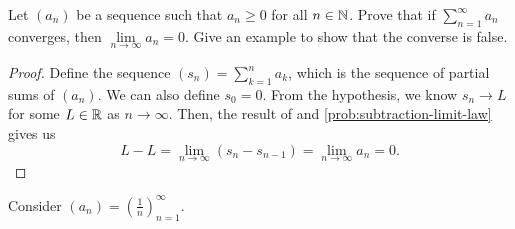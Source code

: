 \begin{problem}
  Let $(a_{n})$ be a sequence such that $a_{n} \geq 0$ for all $n \in \mathbb{N}$. 
  Prove that if $\sum\limits_{n=1}^{\infty} a_{n}$ converges, then
  $\lim\limits_{n \to \infty} a_{n} = 0$. Give an example to show that the 
  converse is false.

  \begin{proof} 
    Define the sequence $(s_{n}) = \sum\limits_{k=1}^{n} a_{k}$, which is the sequence of partial sums of $(a_{n})$.
    We can also define $s_{0} = 0$. From the hypothesis, we know $s_{n} \to L$ for some $L \in \mathbb{R}$ as $n \to \infty$.
    Then, the result of  and \ref{prob:subtraction-limit-law}
    gives us
    \[
      L - L = \lim\limits_{n \to \infty} (s_{n} - s_{n - 1}) = \lim\limits_{n \to \infty} a_{n} = 0.
    \]
  \end{proof}

  Consider $(a_{n}) = \left( \frac{1}{n} \right)_{n=1}^{\infty}$.

\end{problem}
